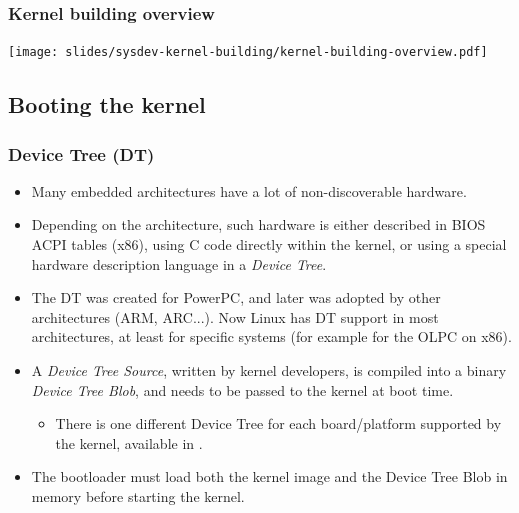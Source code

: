 \begin{frame}
  \frametitle{Kernel building overview}
  \begin{center}
    \texttt{[image: slides/sysdev-kernel-building/kernel-building-overview.pdf]}
  \end{center}
\end{frame}

\subsection{Booting the kernel}

\begin{frame}
  \frametitle{Device Tree (DT)}
  \begin{itemize}
  \item Many embedded architectures have a lot of non-discoverable
    hardware.
  \item Depending on the architecture, such hardware is either
    described in BIOS ACPI tables (x86), using C code directly within the kernel,
    or using a special hardware description language in a {\em Device Tree}.
  \item The DT was created for PowerPC, and later was
    adopted by other architectures (ARM, ARC...). Now Linux
    has DT support in most architectures, at least for specific
    systems (for example for the OLPC on x86).
  \item A {\em Device Tree Source}, written by kernel developers,
    is compiled into a binary {\em Device Tree Blob}, and needs to
    be passed to the kernel at boot time.
    \begin{itemize}
    \item There is one different Device Tree for each board/platform
      supported by the kernel, available in
      .
    \end{itemize}
  \item The bootloader must load both the kernel image and the Device
    Tree Blob in memory before starting the kernel.
  \end{itemize}
\end{frame}

